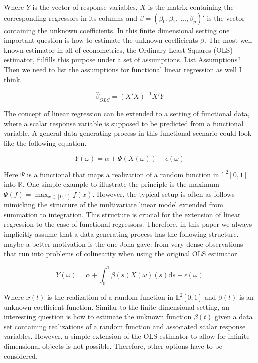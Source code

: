 \documentclass[11pt,twoside,a4paper]{article}
\begin{document}
	Where $Y$ is the vector of response variables, $X$ is the matrix containing the corresponding regressors in its columns and $\beta = (\beta_0, \beta_1, \: \dots, \beta_p)'$ is the vector containing the unknown coefficients.
	In this finite dimensional setting one important question is how to estimate the unknown coefficients $\beta$. The most well known estimator in all of econometrics, the Ordinary Least Squares (OLS) estimator, fulfills this purpose under a set of assumptions. {\color{red}List Assumptions? Then we need to list the assumptions for functional linear regression as well I think.}
	
	\begin{equation}
		\hat{\beta}_{OLS} = (X'X)^{-1}X'Y
	\end{equation}
	
	The concept of linear regression can be extended to a setting of functional data, where a scalar response variable is supposed to be predicted from a functional variable. 
	A general data generating process in this functional scenario could look like the following equation.
	
	\begin{equation}
		Y(\omega) = \alpha + \Psi\left(X(\omega)\right) + \epsilon(\omega)
	\end{equation}
	
	Here $\Psi$ is a functional that maps a realization of a random function in $\mathbb{L}^2[0,1]$ into $\mathbb{R}$. One simple example to illustrate the principle is the maximum $\Psi(f) = \max_{x \in [0,1]}f(x)$.
	However, the typical setup is often as follows mimicking the structure of the multivariate linear model extended from summation to integration. This structure is crucial for the extension of linear regression to the case of functional regressors. Therefore, in this paper we always implicitly assume that a data generating process has the following structure. {\color{red} maybe a better motivation is the one Jona gave: from very dense observations that run into problems of colinearity when using the original OLS estimator}
	
	\begin{equation}\label{DGP}
		Y(\omega) = \alpha + \int_{0}^{1} \beta(s)X(\omega)(s) \mathrm{d}s + \epsilon(\omega)
	\end{equation}
	
	Where $x(t)$ is the realization of a random function in $\mathbb{L}^2[0,1]$ and $\beta(t)$ is an unknown coefficient function. 
	Similar to the finite dimensional setting, an interesting question is how to estimate the unknown function $\beta(t)$ given a data set containing realizations of a random function and associated scalar response variables. However, a simple extension of the OLS estimator to allow for infinite dimensional objects is not possible. Therefore, other options have to be considered.
	
\end{document}
